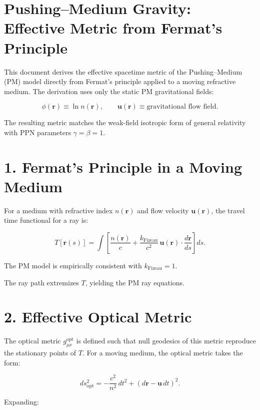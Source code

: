 \documentclass{article}
\begin{document}
\section*{Pushing--Medium Gravity: Effective Metric from Fermat’s Principle}

This document derives the effective spacetime metric of the Pushing--Medium (PM)
model directly from Fermat’s principle applied to a moving refractive medium.
The derivation uses only the static PM gravitational fields:



\[
\phi(\mathbf r) \equiv \ln n(\mathbf r),
\qquad
\mathbf u(\mathbf r) \equiv \text{gravitational flow field}.
\]



The resulting metric matches the weak-field isotropic form of general
relativity with PPN parameters $\gamma = \beta = 1$.

\section*{1. Fermat’s Principle in a Moving Medium}

For a medium with refractive index $n(\mathbf r)$ and flow velocity
$\mathbf u(\mathbf r)$, the travel time functional for a ray is:



\[
T[\mathbf r(s)]
=
\int
\left[
\frac{n(\mathbf r)}{c}
+
\frac{k_{\mathrm{Fizeau}}}{c^2}\,
\mathbf u(\mathbf r)\cdot\frac{d\mathbf r}{ds}
\right]
ds.
\]



The PM model is empirically consistent with $k_{\mathrm{Fizeau}} = 1$.

The ray path extremizes $T$, yielding the PM ray equations.

\section*{2. Effective Optical Metric}

The optical metric $g^{\mathrm{opt}}_{\mu\nu}$ is defined such that null
geodesics of this metric reproduce the stationary points of $T$. For a moving
medium, the optical metric takes the form:



\[
ds_{\mathrm{opt}}^2
=
-\frac{c^2}{n^2}\,dt^2
+
\left(d\mathbf r - \mathbf u\,dt\right)^2.
\]



Expanding:
\end{document}
